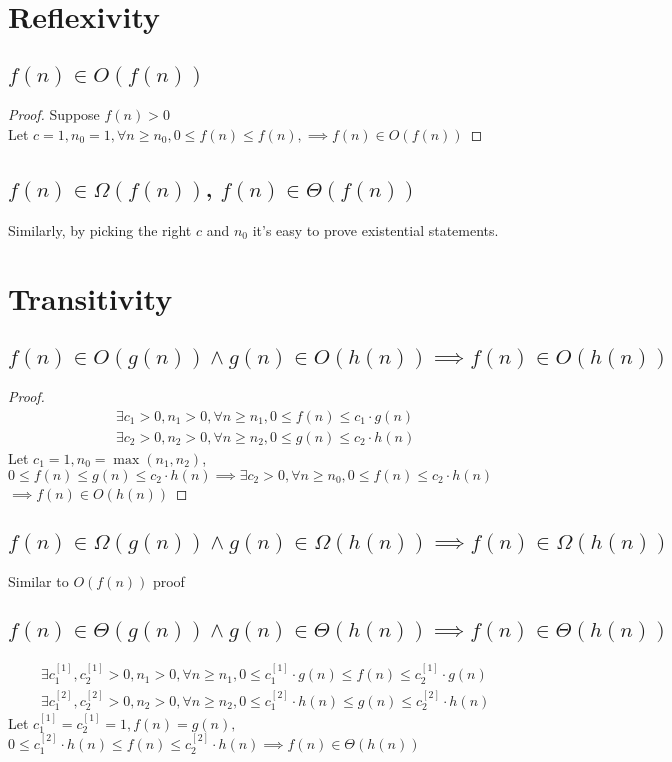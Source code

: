 \documentclass{article}
\begin{document}
\section{Reflexivity}
\subsection{$f(n)\in O(f(n))$}
\begin{proof}
    Suppose $f(n) > 0$\\
    Let $c = 1, n_0 = 1, \forall n \geq n_0, 0 \leq f(n) \leq f(n), \implies f(n) \in O(f(n))$
\end{proof}
\subsection{$f(n) \in \Omega(f(n))$, $f(n) \in \Theta(f(n))$}
Similarly, by picking the right $c$ and $n_0$ it's easy to prove existential statements.

\section{Transitivity}
\subsection{$f(n) \in O(g(n)) \land g(n) \in O(h(n)) \implies f(n) \in O(h(n))$}
\begin{proof}
    \begin{align*}
        &\exists c_1 > 0, n_1 > 0, \forall n \geq n_1, 0 \leq f(n) \leq c_1 \cdot g(n)\\
        &\exists c_2 > 0, n_2 > 0, \forall n \geq n_2, 0 \leq g(n) \leq c_2 \cdot h(n)
    \end{align*}
    Let $c_1 = 1, n_0 = \max(n_1, n_2)$, $0 \leq f(n) \leq g(n) \leq c_2 \cdot h(n) \implies \exists c_2 > 0, \forall n \geq n_0, 0 \leq f(n) \leq c_2 \cdot h(n)$\\
    $\implies f(n) \in O(h(n))$  
\end{proof}
\subsection{$f(n) \in \Omega(g(n)) \land g(n) \in \Omega(h(n)) \implies f(n) \in \Omega(h(n))$}
Similar to $O(f(n))$ proof
\subsection{$f(n) \in \Theta(g(n)) \land g(n) \in \Theta(h(n)) \implies f(n) \in \Theta(h(n))$}
\begin{align*}
    &\exists c_1^{[1]}, c_2^{[1]}> 0, n_1 > 0, \forall n \geq n_1, 0 \leq c_1^{[1]} \cdot g(n) \leq f(n) \leq c_2^{[1]} \cdot g(n)\\
    &\exists c_1^{[2]}, c_2^{[2]} > 0, n_2 > 0, \forall n \geq n_2, 0 \leq c_1^{[2]} \cdot h(n) \leq g(n) \leq c_2^{[2]} \cdot h(n)
\end{align*}
Let $c_1^{[1]} = c_2^{[1]} = 1, f(n) = g(n), $\\
$0 \leq c_1^{[2]} \cdot h(n) \leq f(n) \leq c_2^{[2]} \cdot h(n) \implies f(n) \in \Theta(h(n))$
\end{document}
